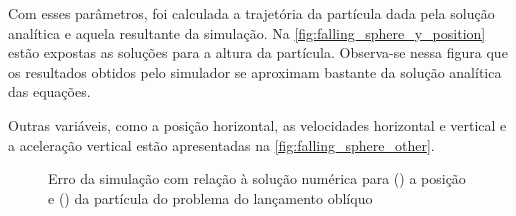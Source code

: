 Com esses parâmetros, foi calculada a trajetória da partícula dada pela solução analítica e aquela resultante da simulação. Na \cref{fig:falling_sphere_y_position} estão expostas as soluções para a altura da partícula. Observa-se nessa figura que os resultados obtidos pelo simulador se aproximam bastante da solução analítica das equações.

Outras variáveis, como a posição horizontal, as velocidades horizontal e vertical e a aceleração vertical estão apresentadas na \cref{fig:falling_sphere_other}.

\begin{figure}[htb!]
	\caption[Erro da simulação com relação à solução numérica para a posição e da partícula do problema do lançamento oblíquo]{Erro da simulação com relação à solução numérica para () a posição e () da partícula do problema do lançamento oblíquo}
	\centering
	\captionsetup[subfloat]{labelfont=bf}
\end{figure}
